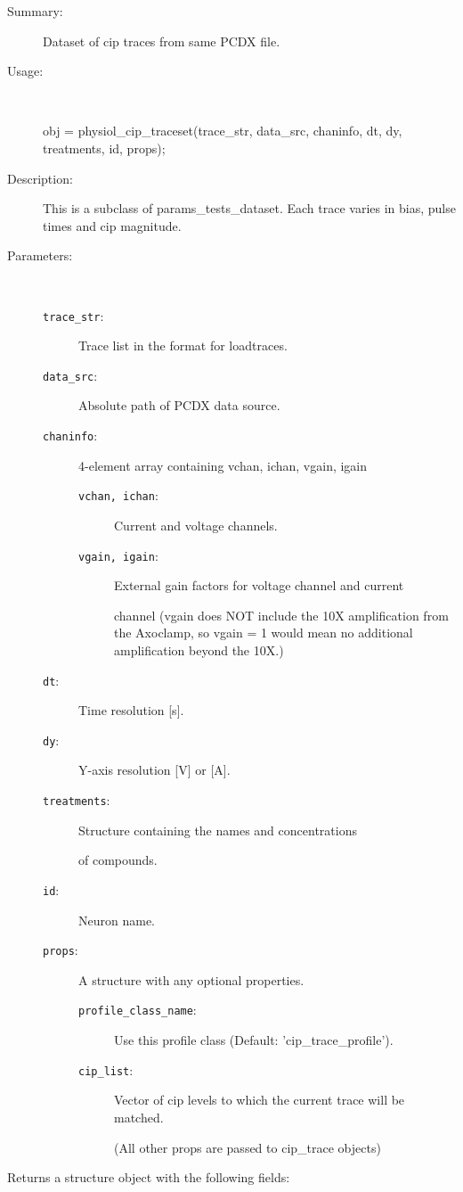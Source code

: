 \begin{description}
\item[Summary:]Dataset of cip traces from same PCDX file.
%
\item[Usage:]~%
\begin{lyxcode}%
obj = physiol\_cip\_traceset(trace\_str, data\_src, chaninfo, dt, dy, treatments, id, props);
%
\end{lyxcode}%
%
\item[Description:]%
This is a subclass of params\_tests\_dataset. Each trace varies in bias, 
 pulse times and cip magnitude.
\item[Parameters:]~
\begin{description}%
\item[\texttt{trace\_str}:]
 Trace list in the format for loadtraces.
\item[\texttt{data\_src}:]
 Absolute path of PCDX data source.
\item[\texttt{chaninfo}:]
 4-element array containing vchan, ichan, vgain, igain
\begin{description}%
\item[\texttt{vchan, ichan}:]
 Current and voltage channels.
\item[\texttt{vgain, igain}:]
 External gain factors for voltage channel and current 

channel
(vgain does NOT include the 10X amplification from the Axoclamp,
so vgain = 1 would mean no additional amplification beyond the 10X.)\end{description}%
\item[\texttt{dt}:]
 Time resolution [s].
\item[\texttt{dy}:]
 Y-axis resolution [V] or [A].
\item[\texttt{treatments}:]
 Structure containing the names and concentrations

of compounds.\item[\texttt{id}:]
 Neuron name.
\item[\texttt{props}:]
 A structure with any optional properties.
\begin{description}%
\item[\texttt{profile\_class\_name}:]
 Use this profile class (Default: 'cip\_trace\_profile').
\item[\texttt{cip\_list}:]
 Vector of cip levels to which the current trace will be matched.

(All other props are passed to cip\_trace objects)\end{description}%
\end{description}%
%
\item[Returns a structure object with the following fields:]~


\end{description}
